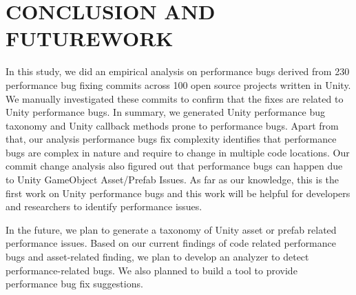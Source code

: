 \chapter{CONCLUSION AND FUTUREWORK}
\label{chap:conclusion}
In this study, we did an empirical analysis on \unity performance bugs derived from 230 performance bug fixing commits across 100 open source projects written in Unity. We manually investigated these commits to confirm that the fixes are related to Unity performance bugs.  In summary, we generated Unity performance bug taxonomy and Unity callback methods prone to performance bugs. Apart from that, our analysis performance bugs fix complexity identifies that \unity performance bugs are complex in nature and require to change in multiple code locations. Our commit change analysis also figured out that performance bugs can happen due to Unity GameObject Asset/Prefab Issues. As far as our knowledge, this is the first work on Unity performance bugs  and this work will be helpful for developers and researchers to identify performance issues.

In the future, we plan to generate a taxonomy of Unity asset or prefab related performance issues. Based on our current findings of code related performance bugs and asset-related finding, we plan to develop an analyzer to detect performance-related bugs. We also planned to build a tool to provide performance bug fix suggestions. 

